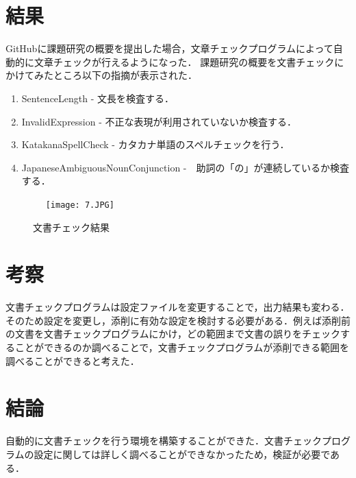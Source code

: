 \documentclass[uplatex,twocolumn,dvipdfmx]{jsarticle}
\begin{document}
\section{結果}
GitHubに課題研究の概要を提出した場合，文章チェックプログラムによって自動的に文章チェックが行えるようになった．
課題研究の概要を文書チェックにかけてみたところ以下の指摘が表示された．
\begin{enumerate}
\item SentenceLength - 文長を検査する．
\item InvalidExpression - 不正な表現が利用されていないか検査する．
\item KatakanaSpellCheck - カタカナ単語のスペルチェックを行う．
\item JapaneseAmbiguousNounConjunction -　助詞の「の」が連続しているか検査する．
\end{enumerate}
\begin{figure}[htb]
\centering　
\texttt{[image: 7.JPG]}
\caption{文書チェック結果}
\end{figure}


\section{考察}

文書チェックプログラムは設定ファイルを変更することで，出力結果も変わる．そのため設定を変更し，添削に有効な設定を検討する必要がある．例えば添削前の文書を文書チェックプログラムにかけ，どの範囲まで文書の誤りをチェックすることができるのか調べることで，文書チェックプログラムが添削できる範囲を調べることができると考えた．

\section{結論}
自動的に文書チェックを行う環境を構築することができた．文書チェックプログラムの設定に関しては詳しく調べることができなかったため，検証が必要である．



\end{document}
